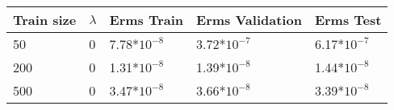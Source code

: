 \begin{center}
\begin{longtable}{l l l l l}
\hline
\hline
\textbf{Train size} & \textbf{$\lambda$} & \textbf{Erms Train} & \textbf{Erms Validation} & \textbf{Erms Test}\\
\hline
\hline
50 & 0 & 7.78*$10^{-8}$ & 3.72*$10^{-7}$ & 6.17*$10^{-7}$  \\
200 & 0 & 1.31*$10^{-8}$ & 1.39*$10^{-8}$ & 1.44*$ 10^{-8}$  \\
500 & 0 & 3.47*$10^{-8}$ & 3.66*$10^{-8}$ & 3.39*$10^{-8}$\\
\hline
\end{longtable}
\setcounter{table}{2}
\end{center}


